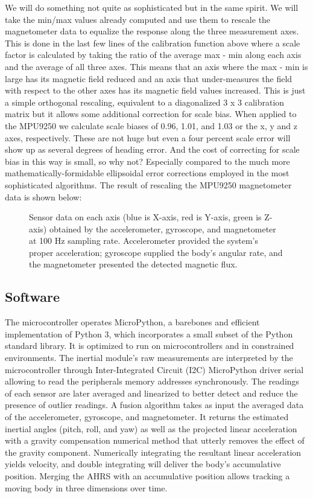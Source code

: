 We will do something not quite as sophisticated but in the same spirit. We will take the min/max values already computed and use them to rescale the magnetometer data to equalize the response along the three measurement axes. This is done in the last few lines of the calibration function above where a scale factor is calculated by taking the ratio of the average max - min along each axis and the average of all three axes. This means that an axis where the max - min is large has its magnetic field reduced and an axis that under-measures the field with respect to the other axes has its magnetic field values increased. This is just a simple orthogonal rescaling, equivalent to a diagonalized 3 x 3 calibration matrix but it allows some additional correction for scale bias. When applied to the MPU9250 we calculate scale biases of 0.96, 1.01, and 1.03 or the x, y and z axes, respectively. These are not huge but even a four percent scale error will show up as several degrees of heading error. And the cost of correcting for scale bias in this way is small, so why not? Especially compared to the much more mathematically-formidable ellipsoidal error corrections employed in the most sophisticated algorithms. The result of rescaling the MPU9250 magnetometer data is shown below:

\begin{figure}[!h]
    \centering
    \resizebox{1\linewidth}{!}{}
    \caption{Sensor data on each axis (blue is X-axis, red is Y-axis, green is Z-axis) obtained by the accelerometer, gyroscope, and magnetometer at 100 Hz sampling rate. Accelerometer provided the system’s proper acceleration; gyroscope supplied the body’s angular rate, and the magnetometer presented the detected magnetic flux.}
\end{figure}


\subsection{Software}
The microcontroller operates MicroPython, a barebones and efficient implementation of Python 3, which incorporates a small subset of the Python standard library. It is optimized to run on microcontrollers and in constrained environments. The inertial module's raw measurements are interpreted by the microcontroller through Inter-Integrated Circuit (I2C) MicroPython driver serial allowing to read the peripherals memory addresses synchronously. The readings of each sensor are later averaged and linearized to better detect and reduce the presence of outlier readings. A fusion algorithm takes as input the averaged data of the accelerometer, gyroscope, and magnetometer. It returns the estimated inertial angles (pitch, roll, and yaw) as well as the projected linear acceleration with a gravity compensation numerical method that utterly removes the effect of the gravity component. Numerically integrating the resultant linear acceleration yields velocity, and double integrating will deliver the body's accumulative position. Merging the AHRS with an accumulative position allows tracking a moving body in three dimensions over time.


